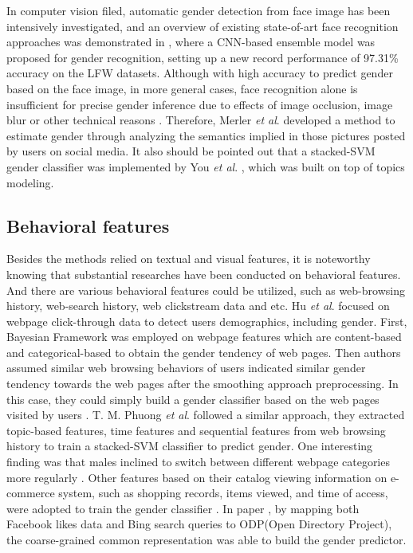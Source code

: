 \documentclass[runningheads]{llncs}
\begin{document}
	In computer vision filed, automatic gender detection from face image has been intensively investigated, and an overview of existing state-of-art face recognition approaches was demonstrated in \cite{antipov2016minimalistic}, where a CNN-based ensemble model was proposed for gender recognition, setting up a new record performance of 97.31\% accuracy on the LFW datasets. Although with high accuracy to predict gender based on the face image, in more general cases, face recognition alone is insufficient for precise gender inference due to effects of image occlusion, image blur or other technical reasons \cite{merler2015you}. Therefore, Merler \textit{et al}. developed a method to estimate gender through analyzing the semantics implied in those pictures posted by users on social media. It also should be pointed out that a stacked-SVM gender classifier was implemented by You \textit{et al}. \cite{you2014eyes}, which was built on top of topics modeling.
	
	\subsection{Behavioral features}
	
	Besides the methods relied on textual and visual features, it is noteworthy knowing that substantial researches have been conducted on behavioral features. And there are various behavioral features could be utilized, such as web-browsing history, web-search history, web clickstream data and etc. Hu \textit{et al}. focused on webpage click-through data to detect user\textquotesingle s demographics, including gender. First, Bayesian Framework was employed on webpage features which are content-based and categorical-based to obtain the gender tendency of web pages. Then authors assumed similar web browsing behaviors of users indicated similar gender tendency towards the web pages after the smoothing approach preprocessing. In this case, they could simply build a gender classifier based on the web pages visited by users \cite{hu2007demographic}. T. M. Phuong \textit{et al}. followed a similar approach, they extracted topic-based features, time features and sequential features from web browsing history to train a stacked-SVM classifier to predict gender. One interesting finding was that males inclined to switch between different webpage categories more regularly \cite{phuong2014gender}. Other features based on their catalog viewing information on e-commerce system, such as shopping records, items viewed, and time of access, were adopted to train the gender classifier \cite{duong2016customer}. In paper \cite{bi2013inferring}, by mapping both Facebook likes data and Bing search queries to ODP(Open Directory Project), the coarse-grained common representation was able to build the gender predictor.
	
\end{document}
